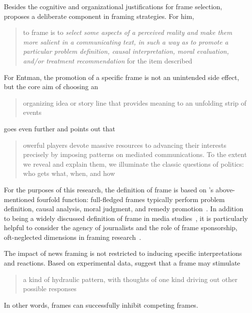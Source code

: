 Besides the cognitive and organizational justifications for frame selection, \citeauthor{entman1993framing} proposes a deliberate component in framing strategies. For him, \blockcquote{entman1993framing}[.]{to frame is to \emph{select some aspects of a perceived reality and make them more salient in a communicating text, in such a way as to promote a particular problem definition, causal interpretation, moral evaluation, and/or treatment recommendation} for the item described}

For Entman, the promotion of a specific frame is not an unintended side effect, but the core aim of choosing an \blockcquote{garrison1994changing}[.]{organizing idea or story line that provides meaning to an unfolding strip of events}

\citeauthor{entman2007framing} goes even further and points out that \blockcquote{entman2007framing}[?]{owerful players devote massive resources to advancing their interests precisely by imposing  patterns on mediated communications. To the extent we reveal and explain them, we illuminate the classic questions of politics: who gets what, when, and how~\autocite{lasswell1950politics}}

For the purposes of this research, the definition of frame is based on \citeauthor{entman1993framing}'s above-mentioned fourfold function: full-fledged frames typically perform problem definition, causal analysis, moral judgment, and remedy promotion~\autocite{entman2007framing}. In addition to being a widely discussed definition of frame in media studies~\autocite{matthes2009what}, it is particularly helpful to consider the agency of journalists and the role of frame sponsorship, oft-neglected dimensions in framing research~\autocite{carragee2004neglect}.

The impact of news framing is not restricted to inducing specific interpretations and reactions. Based on experimental data, \citeauthor{price1997switching} suggest that a frame may stimulate \blockcquote{price1997switching}[.]{a kind of hydraulic pattern, with thoughts of one kind \textelp{} driving out other possible responses} In other words, frames can successfully inhibit competing frames.


